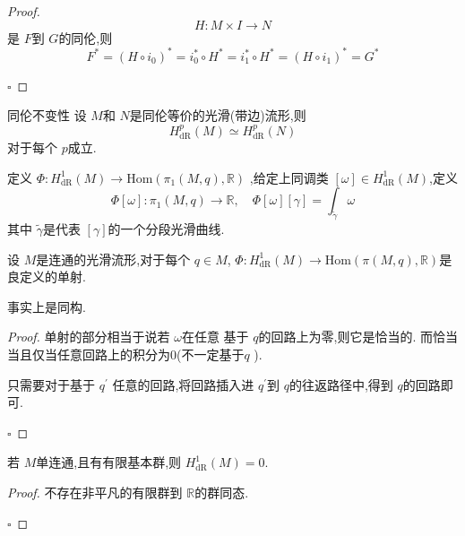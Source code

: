 \documentclass[../../几何与拓扑.tex]{subfiles}
\begin{document}
\begin{proof}
        \[
H:M\times I\to N
\]是 \(  F  \)到 \(  G  \)的同伦,则\[
F^{*}= \left( H\circ  i_0\right)^{*}= i_0^{*}\circ H^{*}= i_1^{*}\circ H^{*}=  \left( H\circ i_1 \right)^{*}= G^{*}  
\]  

    \hfill $\square$
\end{proof}

\begin{definition}{同伦不变性}
    设 \(  M  \)和 \(  N  \)是同伦等价的光滑(带边)流形,则 \[
    H_{\mathrm{dR}}^{p}\left( M \right)\simeq H_{\mathrm{dR}}^{p}\left( N \right)  
    \]对于每个 \(  p  \)成立.   
\end{definition}


\begin{definition}
    定义 \(  \Phi :H_{\mathrm{dR}}^{1}\left( M \right)\to \mathrm{Hom}\left( \pi _1 \left( M,q \right),\mathbb{R}   \right)    \) ,给定上同调类 \(  [ \omega ] \in H_{\mathrm{dR}}^{1}\left( M \right)   \),定义 \[
    \Phi [ \omega ]: \pi _1 \left( M,q \right)\to \mathbb{R}  ,\quad \Phi \left[  \omega  \right]\left[  \gamma  \right]= \int_{ \tilde{\gamma} } \omega   
    \]其中 \(   \tilde{\gamma}   \)是代表 \(  [ \gamma ]  \)的一个分段光滑曲线.    
\end{definition}

\begin{definition}
    设 \(  M  \)是连通的光滑流形,对于每个 \(  q \in M  \), \(  \Phi :H_{\mathrm{dR}}^{1}\left( M \right)\to \mathrm{Hom}\left( \pi \left( M,q \right),\mathbb{R}   \right)    \)是良定义的单射.   
\end{definition}
\begin{remark}
    事实上是同构.
\end{remark}
\begin{proof}
    单射的部分相当于说若 \(   \omega   \)在任意 基于 \(  q  \)的回路上为零,则它是恰当的.  而恰当当且仅当任意回路上的积分为0(不一定基于\(  q  \) ).

    只需要对于基于 \(  q^{\prime}   \) 任意的回路,将回路插入进 \(  q^{\prime}   \)到 \(  q  \)的往返路径中,得到 \(  q  \)的回路即可.   

    \hfill $\square$
\end{proof}

\begin{corollary}
    若 \(  M  \)单连通,且有有限基本群,则 \(  H_{\mathrm{dR}}^{1}\left( M \right)= 0   \).  
\end{corollary}
\begin{proof}
    不存在非平凡的有限群到 \(  \mathbb{R}   \)的群同态. 

    \hfill $\square$
\end{proof}
\end{document}

